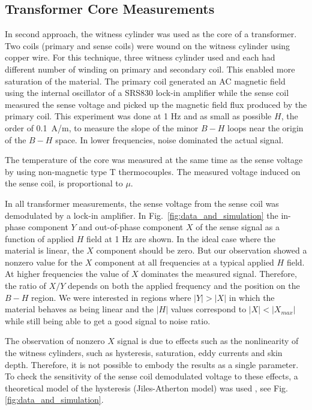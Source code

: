 
\subsection{Transformer Core Measurements}
In second approach, the witness cylinder was used as the core of a
transformer. Two coils (primary and sense coils) were wound on the
witness cylinder using copper wire. For this technique, three witness cylinder used and each had different number of winding on primary and secondary coil. This enabled more saturation of the material. The primary coil generated an AC magnetic field
using the internal oscillator of a SRS830 lock-in amplifier while the
sense coil measured the sense voltage and picked up the magnetic
field flux produced by the primary coil. This experiment was done at 1
Hz and as small as possible $H$, the order of 0.1~A/m,
to measure the slope of the minor $B-H$ loops near the origin of the
$B-H$ space. In lower frequencies, noise dominated the actual signal.

The temperature of the core was measured at the same time as the sense voltage by using non-magnetic type T thermocouples. The measured voltage induced on the sense coil, is proportional to $\mu$.  

In all transformer measurements, the sense voltage from the sense coil
was demodulated by a lock-in amplifier. In
Fig.~\ref{fig:data_and_simulation} the in-phase component $Y$ and
out-of-phase component $X$ of the sense signal as a function of
applied $H$ field at 1 Hz are shown. In the ideal case where the
material is linear, the $X$ component should be zero. But our observation showed a nonzero value for the $X$ component at all frequencies at a typical applied $H$ field. At higher frequencies the value of $X$ dominates the measured signal.
Therefore, the ratio of $X/Y$ depends on both the applied frequency and the position on the
$B-H$ region. We were interested in regions where $\vert Y \vert >
\vert X \vert $ in which the material behaves as being linear and the
$\vert H \vert $ values correspond to $\vert X \vert < \vert X_{max}
\vert$ while still being able to get a good signal to noise ratio.


The observation of nonzero $X$ signal is due to effects such as the nonlinearity of the witness cylinders, such as hysteresis, saturation, eddy currents and skin depth. Therefore, it is not possible to embody the results as a single parameter.
To check the sensitivity of the sense coil demodulated voltage to
these effects, a theoretical model of the hysteresis (Jiles-Atherton
model) was used \cite{bib:jiles}, see Fig.
\ref{fig:data_and_simulation}.

